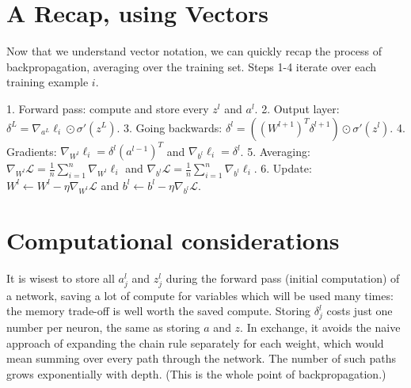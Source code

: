 \documentclass{article}
\begin{document}
\section*{A Recap, using Vectors}
Now that we understand vector notation, we can quickly recap the process of backpropagation, averaging over the training set. Steps 1-4 iterate over each training example $i$.

1. Forward pass: compute and store every $z^l$ and $a^l$.
2. Output layer: $\delta^L = \nabla_{a^L}\ell_i \odot \sigma'(z^L)$.
3. Going backwards: $\delta^l = \left((W^{l+1})^T\delta^{l+1}\right)\odot\sigma'(z^l)$.
4. Gradients: $\nabla_{W^l}\ell_i = \delta^l (a^{l-1})^T$ and $\nabla_{b^l}\ell_i = \delta^l$.
5. Averaging: $\nabla_{W^l}\mathcal{L} = \frac{1}{n}\sum_{i=1}^n \nabla_{W^l}\ell_i$ and $\nabla_{b^l}\mathcal{L} = \frac{1}{n}\sum_{i=1}^n \nabla_{b^l}\ell_i$.
6. Update: $W^l \leftarrow W^l - \eta\nabla_{W^l}\mathcal{L}$ and $b^l \leftarrow b^l - \eta\nabla_{b^l}\mathcal{L}$.

\section*{Computational considerations}

It is wisest to store all $a^l_j$ and $z^l_j$ during the forward pass (initial computation) of a network, saving a lot of compute for variables which will be used many times: the memory trade-off is well worth the saved compute.
Storing $\delta^l_j$ costs just one number per neuron, the same as storing $a$ and $z$. In exchange, it avoids the naive approach of expanding the chain rule separately for each weight, which would mean summing over every path through the network. The number of such paths grows exponentially with depth. (This is the whole point of backpropagation.)
\end{document}
